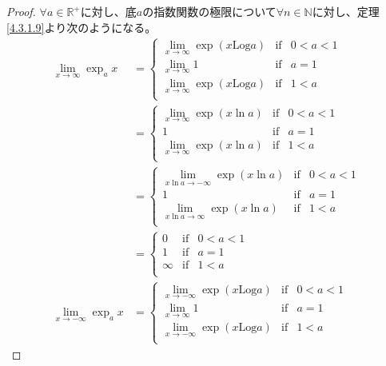 \documentclass[dvipdfmx]{jsarticle}
\begin{document}
\begin{proof}
$\forall a \in \mathbb{R}^{+}$に対し、底$a$の指数関数の極限について$\forall n \in \mathbb{N}$に対し、定理\ref{4.3.1.9}より次のようになる。
\begin{align*}
\lim_{x \rightarrow \infty}{\exp_{a}x} &= \left\{ \begin{matrix}
\lim_{x \rightarrow \infty}{\exp\left( x\mathrm{Log}a \right)} & \mathrm{if} & 0 < a < 1 \\
\lim_{x \rightarrow \infty}1 & \mathrm{if} & a = 1 \\
\lim_{x \rightarrow \infty}{\exp\left( x\mathrm{Log}a \right)} & \mathrm{if} & 1 < a \\
\end{matrix} \right.\ \\
&= \left\{ \begin{matrix}
\lim_{x \rightarrow \infty}{\exp\left( x\ln a \right)} & \mathrm{if} & 0 < a < 1 \\
1 & \mathrm{if} & a = 1 \\
\lim_{x \rightarrow \infty}{\exp\left( x\ln a \right)} & \mathrm{if} & 1 < a \\
\end{matrix} \right.\ \\
&= \left\{ \begin{matrix}
\lim_{x\ln a \rightarrow - \infty}{\exp\left( x\ln a \right)} & \mathrm{if} & 0 < a < 1 \\
1 & \mathrm{if} & a = 1 \\
\lim_{x\ln a \rightarrow \infty}{\exp\left( x\ln a \right)} & \mathrm{if} & 1 < a \\
\end{matrix} \right.\ \\
&= \left\{ \begin{matrix}
0 & \mathrm{if} & 0 < a < 1 \\
1 & \mathrm{if} & a = 1 \\
\infty & \mathrm{if} & 1 < a \\
\end{matrix} \right.\ \\
\lim_{x \rightarrow - \infty}{\exp_{a}x} &= \left\{ \begin{matrix}
\lim_{x \rightarrow - \infty}{\exp\left( x\mathrm{Log}a \right)} & \mathrm{if} & 0 < a < 1 \\
\lim_{x \rightarrow \infty}1 & \mathrm{if} & a = 1 \\
\lim_{x \rightarrow - \infty}{\exp\left( x\mathrm{Log}a \right)} & \mathrm{if} & 1 < a \\

\end{matrix}
\end{align*}
\end{proof}
\end{document}
